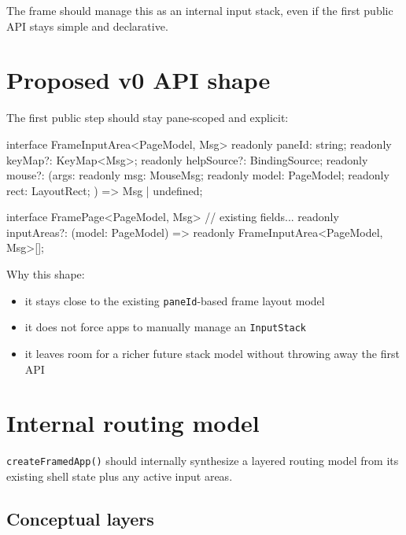 The frame should manage this as an internal input stack, even if the first public API stays simple and declarative.

\section{Proposed v0 API shape}\label{record-044-proposed-v0-api-shape}

The first public step should stay pane-scoped and explicit:

\begin{CodeBlock}
interface FrameInputArea<PageModel, Msg> {
  readonly paneId: string;
  readonly keyMap?: KeyMap<Msg>;
  readonly helpSource?: BindingSource;
  readonly mouse?: (args: {
    readonly msg: MouseMsg;
    readonly model: PageModel;
    readonly rect: LayoutRect;
  }) => Msg | undefined;
}

interface FramePage<PageModel, Msg> {
  // existing fields...
  readonly inputAreas?: (model: PageModel) => readonly FrameInputArea<PageModel, Msg>[];
}
\end{CodeBlock}

Why this shape:

\begin{itemize}
\tightlist
\item
  it stays close to the existing \texttt{p\allowbreak{}a\allowbreak{}n\allowbreak{}e\allowbreak{}I\allowbreak{}d}-based frame layout model
\item
  it does not force apps to manually manage an \texttt{I\allowbreak{}n\allowbreak{}p\allowbreak{}u\allowbreak{}t\allowbreak{}S\allowbreak{}t\allowbreak{}a\allowbreak{}c\allowbreak{}k}
\item
  it leaves room for a richer future stack model without throwing away the first API
\end{itemize}

\section{Internal routing model}\label{record-044-internal-routing-model}

\texttt{c\allowbreak{}r\allowbreak{}e\allowbreak{}a\allowbreak{}t\allowbreak{}e\allowbreak{}F\allowbreak{}r\allowbreak{}a\allowbreak{}m\allowbreak{}e\allowbreak{}d\allowbreak{}A\allowbreak{}p\allowbreak{}p\allowbreak{}(\allowbreak{})} should internally synthesize a layered routing model from its existing shell state plus any active input areas.

\subsection{Conceptual layers}\label{record-044-conceptual-layers}

